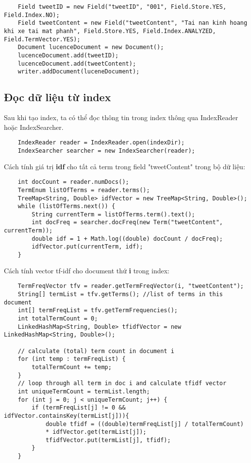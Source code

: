 		\begin{lstlisting}
	Field tweetID = new Field("tweetID", "001", Field.Store.YES, Field.Index.NO);
	Field tweetContent = new Field("tweetContent", "Tai nan kinh hoang khi xe tai mat phanh", Field.Store.YES, Field.Index.ANALYZED, Field.TermVector.YES);				
	Document lucenceDocument = new Document();
	lucenceDocument.add(tweetID);
	lucenceDocument.add(tweetContent);
	writer.addDocument(luceneDocument);
		\end{lstlisting}
		
	\subsection*{Đọc dữ liệu từ index}
	Sau khi tạo index, ta có thể đọc thông tin trong index thông qua IndexReader hoặc IndexSearcher. 
		\begin{lstlisting}
	IndexReader reader = IndexReader.open(indexDir);
	IndexSearcher searcher = new IndexSearcher(reader);
		\end{lstlisting}
	
	Cách tính giá trị \textbf{idf} cho tất cả term trong field "tweetContent" trong bộ dữ liệu:
		\begin{lstlisting}	
	int docCount = reader.numDocs();
	TermEnum listOfTerms = reader.terms();
	TreeMap<String, Double> idfVector = new TreeMap<String, Double>();
	while (listOfTerms.next()) {
		String currentTerm = listOfTerms.term().text();
		int docFreq = searcher.docFreq(new Term("tweetContent", currentTerm));
		double idf = 1 + Math.log((double) docCount / docFreq);
		idfVector.put(currentTerm, idf);
	}
		\end{lstlisting}

	Cách tính vector tf-idf cho document thứ \textbf{i} trong index:	
		\begin{lstlisting}
	TermFreqVector tfv = reader.getTermFreqVector(i, "tweetContent");
	String[] termList = tfv.getTerms(); //list of terms in this document
	int[] termFreqList = tfv.getTermFrequencies();
	int totalTermCount = 0;
	LinkedHashMap<String, Double> tfidfVector = new LinkedHashMap<String, Double>();
	
	// calculate (total) term count in document i
	for (int temp : termFreqList) {
		totalTermCount += temp;
	}
	// loop through all term in doc i and calculate tfidf vector
	int uniqueTermCount = termList.length;
	for (int j = 0; j < uniqueTermCount; j++) {				
		if (termFreqList[j] != 0 && idfVector.containsKey(termList[j])){
			double tfidf = ((double)termFreqList[j] / totalTermCount)
			* idfVector.get(termList[j]);
			tfidfVector.put(termList[j], tfidf);
		}
	}
		\end{lstlisting}
		